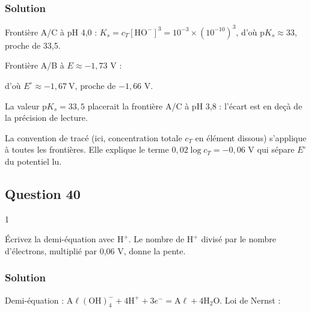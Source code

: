 \documentclass[11pt,a4paper]{article}
\newcommand{\equationajustee}[1]{%
  \sbox{\boiteequation}{$\displaystyle #1$}%
  \ifdim\wd\boiteequation>\linewidth
    \[\resizebox{\linewidth}{!}{\usebox{\boiteequation}}\]%
  \else
    \[#1\]%
  \fi}
\begin{document}
\hypertarget{solution-38}{%
\subsubsection{Solution}\label{solution-38}}

Frontière A/C à pH 4,0 : \(K_s=c_T[\mathrm{HO^-}]^3=10^{-3}\times(10^{-10})^3\), d'où \(\boxed{\mathrm pK_s\approx33}\), proche de 33,5.

Frontière A/B à \(E\approx-1{,}73\) V :

\equationajustee{\begin{aligned}
E&=E^\circ+0{,}02\log c_T\\
&=E^\circ-0{,}06\ \mathrm V
\end{aligned}}

d'où \(\boxed{E^\circ\approx-1{,}67\ \mathrm V}\), proche de \(-1{,}66\) V.

La valeur \(\mathrm pK_s=33{,}5\) placerait la frontière A/C à pH 3,8 : l'écart est en deçà de la précision de lecture.

\begin{methode}

La convention de tracé (ici, concentration totale \(c_T\) en élément dissous) s'applique à toutes les frontières. Elle explique le terme \(0{,}02\log c_T=-0{,}06\) V qui sépare \(E^\circ\) du potentiel lu.

\end{methode}

\hypertarget{question-40}{%
\subsection{Question 40}\label{question-40}}

\begin{indication}{1}

Écrivez la demi-équation avec \(\mathrm H^+\). Le nombre de \(\mathrm H^+\) divisé par le nombre d'électrons, multiplié par 0,06 V, donne la pente.

\end{indication}

\hypertarget{solution-39}{%
\subsubsection{Solution}\label{solution-39}}

Demi-équation : \(\mathrm{A\ell(OH)_4^-}+4\mathrm H^++3e^-=\mathrm{A\ell}+4\mathrm H_2\mathrm O\). Loi de Nernst :
\end{document}
